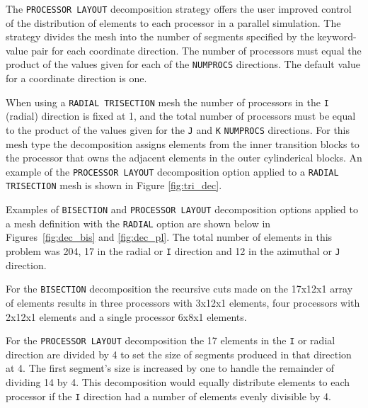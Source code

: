 The \texttt{PROCESSOR LAYOUT} decomposition strategy offers the user
improved control of the distribution of elements to each
processor in a parallel simulation. The strategy divides the mesh into the number of segments specified by the keyword-value pair for each coordinate direction. The number of
processors must equal the product of the values given for each of the
\texttt{NUMPROCS} directions. The default value for a coordinate direction is one.

When using a \texttt{RADIAL TRISECTION} mesh the number of processors in the \texttt{I} (radial) direction is fixed at 1, and the total number of processors must be equal to the
product of the values given for the \texttt{J} and \texttt{K}
\texttt{NUMPROCS} directions. For this mesh type the decomposition
assigns elements from the inner transition blocks to the processor
that owns the adjacent elements in the outer cylinderical blocks.
An example of the \texttt{PROCESSOR LAYOUT} decomposition option
applied to a \texttt{RADIAL TRISECTION} mesh is shown in Figure \ref{fig:tri_dec}.

Examples of \texttt{BISECTION} and
\texttt{PROCESSOR LAYOUT} decomposition options applied to a mesh definition with the
\texttt{RADIAL} option are shown below in
Figures~\ref{fig:dec_bis} and
 \ref{fig:dec_pl}. The total
number of elements in this problem was 204, 17 in the radial or
\texttt{I} direction and 12 in the azimuthal or \texttt{J} direction.

For the \texttt{BISECTION} decomposition the recursive cuts made on
the 17x12x1 array of elements results in three processors with 3x12x1 elements,
four processors with 2x12x1
elements and a single processor 6x8x1 elements.

For the \texttt{PROCESSOR LAYOUT} decomposition the
17 elements in the \texttt{I} or radial direction are divided by 4 to
set the size of segments produced in that direction at 4. The first segment's size is increased by one to handle the remainder of dividing 14 by 4. This decomposition would equally
distribute elements to each processor if the \texttt{I} direction had a number of
elements evenly divisible by 4.

